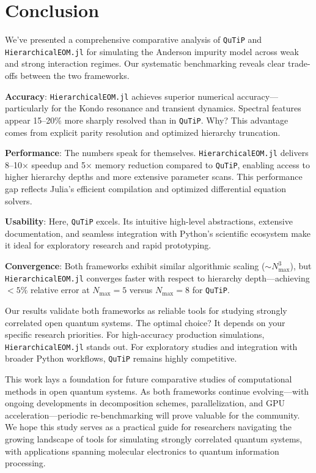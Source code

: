 \documentclass[preprint,1p]{elsarticle}
\begin{document}
\section{Conclusion}
\label{sec:conclusion}

We've presented a comprehensive comparative analysis of \texttt{QuTiP} and \texttt{HierarchicalEOM.jl} for simulating the Anderson impurity model across weak and strong interaction regimes. Our systematic benchmarking reveals clear trade-offs between the two frameworks.

\textbf{Accuracy}: \texttt{HierarchicalEOM.jl} achieves superior numerical accuracy—particularly for the Kondo resonance and transient dynamics. Spectral features appear 15--20\% more sharply resolved than in \texttt{QuTiP}. Why? This advantage comes from explicit parity resolution and optimized hierarchy truncation.

\textbf{Performance}: The numbers speak for themselves. \texttt{HierarchicalEOM.jl} delivers 8--10× speedup and 5× memory reduction compared to \texttt{QuTiP}, enabling access to higher hierarchy depths and more extensive parameter scans. This performance gap reflects Julia's efficient compilation and optimized differential equation solvers.

\textbf{Usability}: Here, \texttt{QuTiP} excels. Its intuitive high-level abstractions, extensive documentation, and seamless integration with Python's scientific ecosystem make it ideal for exploratory research and rapid prototyping.

\textbf{Convergence}: Both frameworks exhibit similar algorithmic scaling ($\sim N_{\text{max}}^3$), but \texttt{HierarchicalEOM.jl} converges faster with respect to hierarchy depth—achieving $<5\%$ relative error at $N_{\text{max}} = 5$ versus $N_{\text{max}} = 8$ for \texttt{QuTiP}.

Our results validate both frameworks as reliable tools for studying strongly correlated open quantum systems. The optimal choice? It depends on your specific research priorities. For high-accuracy production simulations, \texttt{HierarchicalEOM.jl} stands out. For exploratory studies and integration with broader Python workflows, \texttt{QuTiP} remains highly competitive.

This work lays a foundation for future comparative studies of computational methods in open quantum systems. As both frameworks continue evolving—with ongoing developments in decomposition schemes, parallelization, and GPU acceleration—periodic re-benchmarking will prove valuable for the community. We hope this study serves as a practical guide for researchers navigating the growing landscape of tools for simulating strongly correlated quantum systems, with applications spanning molecular electronics to quantum information processing.
\end{document}
